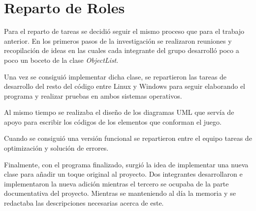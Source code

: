 \section{Reparto de Roles}
Para el reparto de tareas se decidió seguir el mismo proceso que para el trabajo anterior. En los primeros pasos de la investigación se realizaron reuniones y recopilación de ideas en las cuales cada integrante del grupo desarrolló poco a poco un boceto de la clase \emph{ObjectList}.

Una vez se consiguió implementar dicha clase, se repartieron las tareas de desarrollo del resto del código entre Linux y Windows para seguir elaborando el programa y realizar pruebas en ambos sistemas operativos. 

Al mismo tiempo se realizaba el diseño de los diagramas UML que servía de apoyo para escribir los códigos de los elementos que conforman el juego.

Cuando se consiguió una versión funcional se repartieron entre el equipo tareas de optimización y solución de errores.

Finalmente, con el programa finalizado, surgió la idea de implementar una nueva clase para añadir un toque original al proyecto. Dos integrantes desarrollaron e implementaron la nueva adición mientras el tercero se ocupaba de la parte documentativa del proyecto. Mientras se manteniendo al día la memoria y se redactaba las descripciones necesarias acerca de este. 